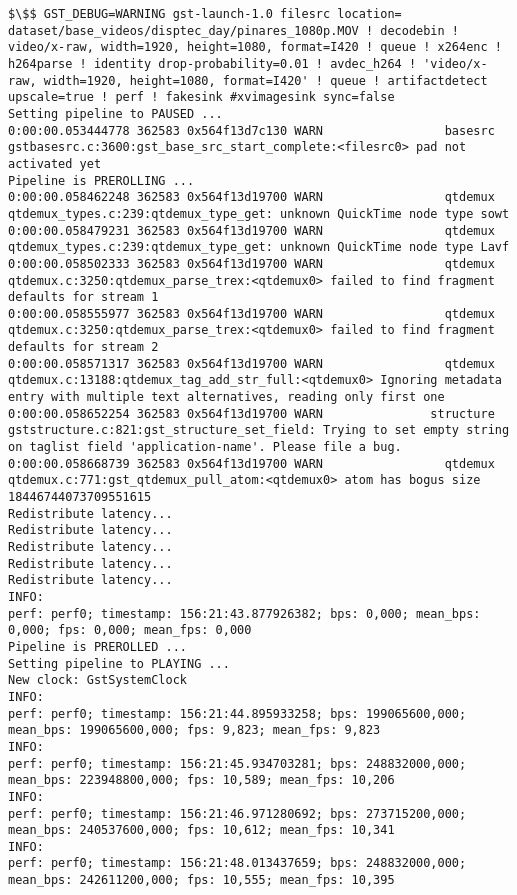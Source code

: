 \documentclass[12pt,oneside]{book}
\begin{document}
\begin{lstlisting}
$\$$ GST_DEBUG=WARNING gst-launch-1.0 filesrc location= dataset/base_videos/disptec_day/pinares_1080p.MOV ! decodebin ! video/x-raw, width=1920, height=1080, format=I420 ! queue ! x264enc ! h264parse ! identity drop-probability=0.01 ! avdec_h264 ! 'video/x-raw, width=1920, height=1080, format=I420' ! queue ! artifactdetect upscale=true ! perf ! fakesink #xvimagesink sync=false
Setting pipeline to PAUSED ...
0:00:00.053444778 362583 0x564f13d7c130 WARN                 basesrc gstbasesrc.c:3600:gst_base_src_start_complete:<filesrc0> pad not activated yet
Pipeline is PREROLLING ...
0:00:00.058462248 362583 0x564f13d19700 WARN                 qtdemux qtdemux_types.c:239:qtdemux_type_get: unknown QuickTime node type sowt
0:00:00.058479231 362583 0x564f13d19700 WARN                 qtdemux qtdemux_types.c:239:qtdemux_type_get: unknown QuickTime node type Lavf
0:00:00.058502333 362583 0x564f13d19700 WARN                 qtdemux qtdemux.c:3250:qtdemux_parse_trex:<qtdemux0> failed to find fragment defaults for stream 1
0:00:00.058555977 362583 0x564f13d19700 WARN                 qtdemux qtdemux.c:3250:qtdemux_parse_trex:<qtdemux0> failed to find fragment defaults for stream 2
0:00:00.058571317 362583 0x564f13d19700 WARN                 qtdemux qtdemux.c:13188:qtdemux_tag_add_str_full:<qtdemux0> Ignoring metadata entry with multiple text alternatives, reading only first one
0:00:00.058652254 362583 0x564f13d19700 WARN               structure gststructure.c:821:gst_structure_set_field: Trying to set empty string on taglist field 'application-name'. Please file a bug.
0:00:00.058668739 362583 0x564f13d19700 WARN                 qtdemux qtdemux.c:771:gst_qtdemux_pull_atom:<qtdemux0> atom has bogus size 18446744073709551615
Redistribute latency...
Redistribute latency...
Redistribute latency...
Redistribute latency...
Redistribute latency...
INFO:
perf: perf0; timestamp: 156:21:43.877926382; bps: 0,000; mean_bps: 0,000; fps: 0,000; mean_fps: 0,000
Pipeline is PREROLLED ...
Setting pipeline to PLAYING ...
New clock: GstSystemClock
INFO:
perf: perf0; timestamp: 156:21:44.895933258; bps: 199065600,000; mean_bps: 199065600,000; fps: 9,823; mean_fps: 9,823
INFO:
perf: perf0; timestamp: 156:21:45.934703281; bps: 248832000,000; mean_bps: 223948800,000; fps: 10,589; mean_fps: 10,206
INFO:
perf: perf0; timestamp: 156:21:46.971280692; bps: 273715200,000; mean_bps: 240537600,000; fps: 10,612; mean_fps: 10,341
INFO:
perf: perf0; timestamp: 156:21:48.013437659; bps: 248832000,000; mean_bps: 242611200,000; fps: 10,555; mean_fps: 10,395

\end{lstlisting}
\end{document}
